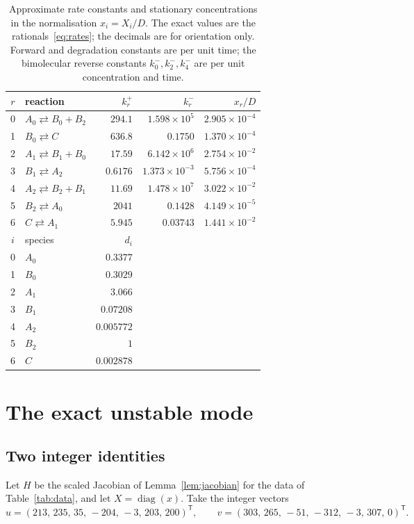 \documentclass[11pt,a4paper]{article}
\theoremstyle{plain}
\theoremstyle{definition}
\theoremstyle{remark}
\numberwithin{equation}{section}
\newcommand{\diag}{\operatorname{diag}}
\begin{document}
\begin{table}[htbp]
\centering\small
\begin{tabular}{@{}clrrr@{}}
\toprule
$r$ & reaction & $k_r^+$ & $k_r^-$ & $x_r/D$ \\
\midrule
0 & $A_0\rightleftarrows B_0+B_2$ & $294.1$ & $1.598\times10^{5}$ & $2.905\times10^{-4}$\\
1 & $B_0\rightleftarrows C$       & $636.8$ & $0.1750$ & $1.370\times10^{-4}$\\
2 & $A_1\rightleftarrows B_1+B_0$ & $17.59$ & $6.142\times10^{6}$ & $2.754\times10^{-2}$\\
3 & $B_1\rightleftarrows A_2$     & $0.6176$ & $1.373\times10^{-3}$ & $5.756\times10^{-4}$\\
4 & $A_2\rightleftarrows B_2+B_1$ & $11.69$ & $1.478\times10^{7}$ & $3.022\times10^{-2}$\\
5 & $B_2\rightleftarrows A_0$     & $2041$ & $0.1428$ & $4.149\times10^{-5}$\\
6 & $C\rightleftarrows A_1$       & $5.945$ & $0.03743$ & $1.441\times10^{-2}$\\
\midrule
$i$ & species & $d_i$ & & \\
\midrule
0 & $A_0$ & $0.3377$ && \\
1 & $B_0$ & $0.3029$ && \\
2 & $A_1$ & $3.066$ && \\
3 & $B_1$ & $0.07208$ && \\
4 & $A_2$ & $0.005772$ && \\
5 & $B_2$ & $1$ && \\
6 & $C$   & $0.002878$ && \\
\bottomrule
\end{tabular}
\caption{Approximate rate constants and stationary concentrations in the normalisation $x_i=X_i/D$. The exact values are the rationals~\eqref{eq:rates}; the decimals are for orientation only. Forward and degradation constants are per unit time; the bimolecular reverse constants $k_0^-,k_2^-,k_4^-$ are per unit concentration and time.}
\label{tab:rates}
\end{table}

\section{The exact unstable mode}\label{sec:mode}

\subsection{Two integer identities}
Let $H$ be the scaled Jacobian of Lemma~\ref{lem:jacobian} for the data of Table~\ref{tab:data}, and let $X=\diag(x)$. Take the integer vectors
\begin{equation}\label{eq:uv}
u=(213,\,235,\,35,\,-204,\,-3,\,203,\,200)^{\mathsf T},\qquad
v=(303,\,265,\,-51,\,-312,\,-3,\,307,\,0)^{\mathsf T}.
\end{equation}
\end{document}
